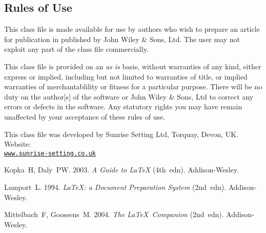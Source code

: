 \documentclass[times]{cpeauth}
\begin{document}
\subsection{Rules of Use}
This class file is made available for use by authors who wish to
prepare an article for publication in \emph{\journalnamelc}
published by John Wiley \& Sons, Ltd. The user may not exploit any
part of the class file commercially.

This class file is provided on an \emph{as is}  basis, without
warranties of any kind, either express or implied, including but
not limited to warranties of title, or implied  warranties of
merchantablility or fitness for a particular purpose. There will
be no duty on the author[s] of the software or  John Wiley \&
Sons, Ltd to correct any errors or defects in the software. Any
statutory  rights you may have remain unaffected by your
acceptance of these rules of use.

\ack This class file was developed by Sunrise Setting Ltd,
Torquay, Devon, UK. Website:\\
\href{http://www.sunrise-setting.co.uk}{\texttt{www.sunrise-setting.co.uk}}

\begin{thebibliography}{9}

 Kopka~H, Daly~PW. 2003. \emph{A Guide to \LaTeX} (4th~edn).
Addison-Wesley.

 Lamport~L. 1994. \emph{\LaTeX: a Document Preparation System} (2nd~edn).
Addison-Wesley.

 Mittelbach~F, Goossens~M. 2004. \emph{The \LaTeX\ Companion}
(2nd~edn). Addison-Wesley.
\end{thebibliography}
\end{document}
